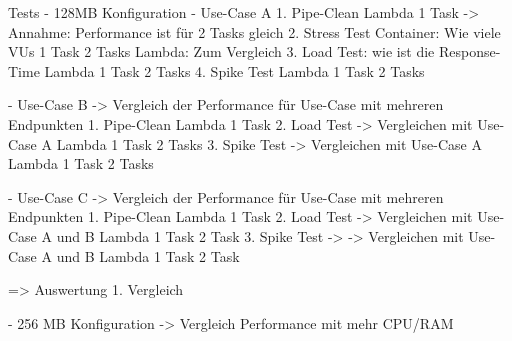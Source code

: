 Tests
- 128MB Konfiguration
    - Use-Case A
        1. Pipe-Clean
            Lambda
            1 Task -> Annahme: Performance ist für 2 Tasks gleich
        2. Stress Test Container: Wie viele VUs
            1 Task
            2 Tasks
            Lambda: Zum Vergleich
        3. Load Test: wie ist die Response-Time
            Lambda
            1 Task
            2 Tasks
        4. Spike Test
            Lambda
            1 Task
            2 Tasks
            
    - Use-Case B -> Vergleich der Performance für Use-Case mit mehreren Endpunkten
        1. Pipe-Clean
            Lambda
            1 Task
        2. Load Test -> Vergleichen mit Use-Case A
            Lambda
            1 Task
            2 Tasks
        3. Spike Test -> Vergleichen mit Use-Case A
            Lambda
            1 Task
            2 Tasks
        
    - Use-Case C -> Vergleich der Performance für Use-Case mit mehreren Endpunkten
        1. Pipe-Clean
            Lambda
            1 Task
        2. Load Test -> Vergleichen mit Use-Case A und B
            Lambda
            1 Task
            2 Task
        3. Spike Test -> -> Vergleichen mit Use-Case A und B
            Lambda
            1 Task
            2 Task
            
    => Auswertung
        1. Vergleich 
    
    
- 256 MB Konfiguration -> Vergleich Performance mit mehr CPU/RAM